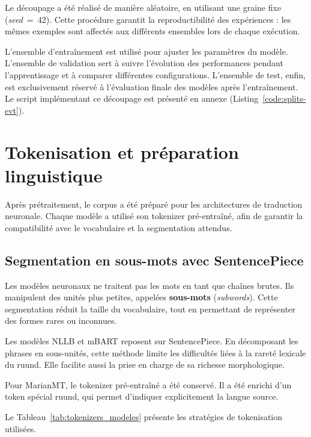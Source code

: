 Le découpage a été réalisé de manière aléatoire, en utilisant une graine fixe (\textit{seed}~=~42). Cette procédure garantit la reproductibilité des expériences : les mêmes exemples sont affectés aux différents ensembles lors de chaque exécution.

L'ensemble d'entraînement est utilisé pour ajuster les paramètres du modèle. L'ensemble de validation sert à suivre l'évolution des performances pendant l'apprentissage et à comparer différentes configurations. L'ensemble de test, enfin, est exclusivement réservé à l'évaluation finale des modèles après l'entraînement. Le script implémentant ce découpage est présenté en annexe (Listing~\ref{code:splits-evt}).

\section{Tokenisation et préparation linguistique}

Après prétraitement, le corpus a été préparé pour les architectures de traduction neuronale. Chaque modèle a utilisé son tokenizer pré-entraîné, afin de garantir la compatibilité avec le vocabulaire et la segmentation attendus.

\subsection{Segmentation en sous-mots avec SentencePiece}

Les modèles neuronaux ne traitent pas les mots en tant que chaînes brutes. Ils manipulent des unités plus petites, appelées \textbf{sous-mots} (\textit{subwords}). Cette segmentation réduit la taille du vocabulaire, tout en permettant de représenter des formes rares ou inconnues.

Les modèles \ac{NLLB} et \ac{mBART} reposent sur \ac{SentencePiece}. En décomposant les phrases en sous-unités, cette méthode limite les difficultés liées à la rareté lexicale du ruund. Elle facilite aussi la prise en charge de sa richesse morphologique.

Pour \ac{MarianMT}, le tokenizer pré-entraîné a été conservé. Il a été enrichi d'un token spécial ruund, qui permet d'indiquer explicitement la langue source.

Le Tableau~\ref{tab:tokenizers_modeles} présente les stratégies de tokenisation utilisées.

